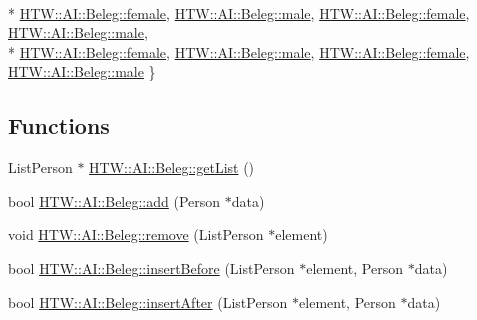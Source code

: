 \begin{DoxyCompactItemize}
\\*
\hyperlink{namespace_h_t_w_1_1_a_i_1_1_beleg_a79f3a46a934454a934cc7ec60d4f2e2ca818689f56a2a5ceab509322b9572679a}{H\-T\-W\-::\-A\-I\-::\-Beleg\-::female}, 
\hyperlink{namespace_h_t_w_1_1_a_i_1_1_beleg_a79f3a46a934454a934cc7ec60d4f2e2ca88c8052a9fd6b77c957e9d7048392450}{H\-T\-W\-::\-A\-I\-::\-Beleg\-::male}, 
\hyperlink{namespace_h_t_w_1_1_a_i_1_1_beleg_a79f3a46a934454a934cc7ec60d4f2e2ca818689f56a2a5ceab509322b9572679a}{H\-T\-W\-::\-A\-I\-::\-Beleg\-::female}, 
\hyperlink{namespace_h_t_w_1_1_a_i_1_1_beleg_a79f3a46a934454a934cc7ec60d4f2e2ca88c8052a9fd6b77c957e9d7048392450}{H\-T\-W\-::\-A\-I\-::\-Beleg\-::male}, 
\\*
\hyperlink{namespace_h_t_w_1_1_a_i_1_1_beleg_a79f3a46a934454a934cc7ec60d4f2e2ca818689f56a2a5ceab509322b9572679a}{H\-T\-W\-::\-A\-I\-::\-Beleg\-::female}, 
\hyperlink{namespace_h_t_w_1_1_a_i_1_1_beleg_a79f3a46a934454a934cc7ec60d4f2e2ca88c8052a9fd6b77c957e9d7048392450}{H\-T\-W\-::\-A\-I\-::\-Beleg\-::male}, 
\hyperlink{namespace_h_t_w_1_1_a_i_1_1_beleg_a79f3a46a934454a934cc7ec60d4f2e2ca818689f56a2a5ceab509322b9572679a}{H\-T\-W\-::\-A\-I\-::\-Beleg\-::female}, 
\hyperlink{namespace_h_t_w_1_1_a_i_1_1_beleg_a79f3a46a934454a934cc7ec60d4f2e2ca88c8052a9fd6b77c957e9d7048392450}{H\-T\-W\-::\-A\-I\-::\-Beleg\-::male}
 \}
\end{DoxyCompactItemize}
\subsection*{Functions}
\begin{DoxyCompactItemize}
\item 
List\-Person $\ast$ \hyperlink{namespace_h_t_w_1_1_a_i_1_1_beleg_a60ff115fb18a8cf3198fcaccec5e3201}{H\-T\-W\-::\-A\-I\-::\-Beleg\-::get\-List} ()
\item 
bool \hyperlink{namespace_h_t_w_1_1_a_i_1_1_beleg_af6ed0d1b191a944ce94086733b37953e}{H\-T\-W\-::\-A\-I\-::\-Beleg\-::add} (Person $\ast$data)
\item 
void \hyperlink{namespace_h_t_w_1_1_a_i_1_1_beleg_a89cbff7fbe68e50ec5b0995d936060c1}{H\-T\-W\-::\-A\-I\-::\-Beleg\-::remove} (List\-Person $\ast$element)
\item 
bool \hyperlink{namespace_h_t_w_1_1_a_i_1_1_beleg_a481e955551f92cf8b4a08f598eaae9f3}{H\-T\-W\-::\-A\-I\-::\-Beleg\-::insert\-Before} (List\-Person $\ast$element, Person $\ast$data)
\item 
bool \hyperlink{namespace_h_t_w_1_1_a_i_1_1_beleg_af8912e7f8d03efe279d299cce708ea9b}{H\-T\-W\-::\-A\-I\-::\-Beleg\-::insert\-After} (List\-Person $\ast$element, Person $\ast$data)
\end{DoxyCompactItemize}
